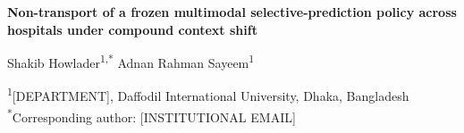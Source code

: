 \documentclass[11pt,a4paper]{article}
\date{}
\begin{document}
\begin{center}
{\LARGE\bfseries Non-transport of a frozen multimodal selective-prediction
policy across hospitals under compound context shift\par}

\vspace{1.5em}

{\large Shakib Howlader\textsuperscript{1,*} \quad
Adnan Rahman Sayeem\textsuperscript{1}\par}

\vspace{1em}

\begin{singlespace}
\textsuperscript{1}[DEPARTMENT], Daffodil International University, Dhaka,
Bangladesh\\
\textsuperscript{*}Corresponding author: [INSTITUTIONAL EMAIL]
\end{singlespace}
\end{center}

\vspace{2em}
\end{document}
